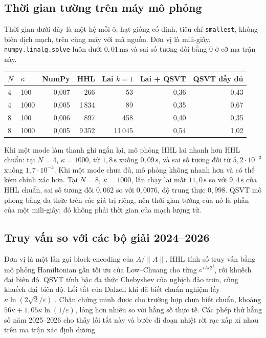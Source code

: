 \documentclass[11pt,a4paper]{article}
\newenvironment{revisedblock}{\par\color{revised}\ignorespaces}{\par}
\begin{document}
\begin{revisedblock}
\subsection{Thời gian tường trên máy mô phỏng}
\label{sec:wall}
Thời gian dưới đây là một hệ mỗi ô, hạt giống cố định, tiêu chí \texttt{smallest}, không biên dịch mạch, trên cùng máy với mã nguồn.
Đơn vị là mili-giây.
\texttt{numpy.linalg.solve} luôn dưới \(0{,}01\,\mathrm{ms}\) và sai số tương đối bằng 0 ở cỡ ma trận này.

\begin{center}
\color{revised}
\begin{tabular}{@{}llrrrrr@{}}
\toprule
\(N\) & \(\kappa\) & NumPy & HHL & Lai \(k=1\) & Lai + QSVT & QSVT đầy đủ \\
\midrule
4 & 100 & 0{,}007 & 266 & 53 & 0{,}36 & 0{,}43 \\
4 & 1000 & 0{,}005 & 1\,834 & 89 & 0{,}35 & 0{,}67 \\
8 & 100 & 0{,}006 & 897 & 458 & 0{,}40 & 0{,}35 \\
8 & 1000 & 0{,}005 & 9\,352 & 11\,045 & 0{,}54 & 1{,}02 \\
\bottomrule
\end{tabular}
\end{center}

Khi một mode làm thanh ghi ngắn lại, mô phỏng HHL lai nhanh hơn HHL chuẩn: tại \(N=4\), \(\kappa=1000\), từ \(1{,}8\,\mathrm{s}\) xuống \(0{,}09\,\mathrm{s}\), và sai số tương đối từ \(5{,}2\cdot 10^{-3}\) xuống \(1{,}7\cdot 10^{-3}\).
Khi một mode chưa đủ, mô phỏng không nhanh hơn và có thể kém chính xác hơn.
Tại \(N=8\), \(\kappa=1000\), lần chạy lai mất \(11{,}0\,\mathrm{s}\) so với \(9{,}4\,\mathrm{s}\) của HHL chuẩn, sai số tương đối \(0{,}062\) so với \(0{,}0076\), độ trung thực \(0{,}998\).
QSVT mô phỏng bằng đa thức trên các giá trị riêng, nên thời gian tường của nó là phần của một mili-giây; đó không phải thời gian của mạch lượng tử.

\subsection{Truy vấn so với các bộ giải 2024--2026}
\label{sec:queries}
Đơn vị là một lần gọi block-encoding của \(A/\lVert A\rVert\).
HHL tính số truy vấn bằng mô phỏng Hamiltonian gần tối ưu của Low--Chuang cho từng \(e^{iAt2^j}\), rồi khuếch đại biên độ.
QSVT tính bậc đa thức Chebyshev của nghịch đảo trơn, cũng khuếch đại biên độ.
Lối tắt của Dalzell khi đã biết chuẩn nghiệm lấy \(\kappa\ln(2\sqrt{2}/\varepsilon)\) \citep{dalzell2024}.
Chặn chứng minh được cho trường hợp chưa biết chuẩn, khoảng \(56\kappa+1{,}05\kappa\ln(1/\varepsilon)\), lỏng hơn nhiều so với hằng số thực tế.
Các phép thử hằng số năm 2025--2026 cho thấy lối tắt này và bước đi đoạn nhiệt rời rạc \citep{costa2022,jennings2025} xấp xỉ nhau trên ma trận xác định dương.


\end{revisedblock}
\end{document}
